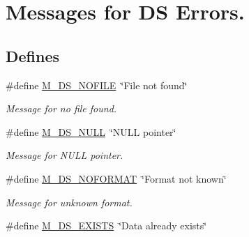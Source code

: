 \hypertarget{group___m___d_s___messages}{
\section{Messages for DS Errors.}
\label{group___m___d_s___messages}
}
\subsection*{Defines}
\begin{DoxyCompactItemize}
\item 
\hypertarget{group___m___d_s___messages_gadd043ccc956aaee49b9c646f940c167b}{
\#define \hyperlink{group___m___d_s___messages_gadd043ccc956aaee49b9c646f940c167b}{M\_\-DS\_\-NOFILE}~\char`\"{}File not found\char`\"{}}
\label{group___m___d_s___messages_gadd043ccc956aaee49b9c646f940c167b}

\begin{DoxyCompactList}\small\item\em Message for no file found. \item\end{DoxyCompactList}\item 
\hypertarget{group___m___d_s___messages_ga0d502db70be066b76fa94dc1eb9ef75c}{
\#define \hyperlink{group___m___d_s___messages_ga0d502db70be066b76fa94dc1eb9ef75c}{M\_\-DS\_\-NULL}~\char`\"{}NULL pointer\char`\"{}}
\label{group___m___d_s___messages_ga0d502db70be066b76fa94dc1eb9ef75c}

\begin{DoxyCompactList}\small\item\em Message for NULL pointer. \item\end{DoxyCompactList}\item 
\hypertarget{group___m___d_s___messages_ga05191be522c29caa6f80baddfb2a109c}{
\#define \hyperlink{group___m___d_s___messages_ga05191be522c29caa6f80baddfb2a109c}{M\_\-DS\_\-NOFORMAT}~\char`\"{}Format not known\char`\"{}}
\label{group___m___d_s___messages_ga05191be522c29caa6f80baddfb2a109c}

\begin{DoxyCompactList}\small\item\em Message for unknown format. \item\end{DoxyCompactList}\item 
\hypertarget{group___m___d_s___messages_ga33ff33533363ff94af03b832587f47c6}{
\#define \hyperlink{group___m___d_s___messages_ga33ff33533363ff94af03b832587f47c6}{M\_\-DS\_\-EXISTS}~\char`\"{}Data already exists\char`\"{}}
\label{group___m___d_s___messages_ga33ff33533363ff94af03b832587f47c6}


\end{DoxyCompactItemize}
